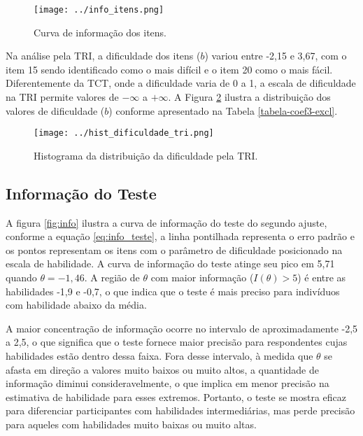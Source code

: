 \clearpage
\begin{figure}[H]
	\centering
	\caption{Curva de informação dos itens.}
	\texttt{[image: ../info\_itens.png]}
	\parbox{\textwidth}{
		\centering %
	}
	\label{fig:info_itens}
\end{figure}

Na análise pela TRI, a dificuldade dos itens ($b$) variou entre -2,15 e 3,67, com o item 15 sendo identificado como o mais difícil e o item 20 como o mais fácil. Diferentemente da TCT, onde a dificuldade varia de 0 a 1, a escala de dificuldade na TRI permite valores de $- \infty$ a $+ \infty$. A Figura \ref{fig:dificuldade_tri} ilustra a distribuição dos valores de dificuldade ($b$) conforme apresentado na Tabela \ref{tabela-coef3-excl}.

\begin{figure}[H]
	\centering
	\caption{Histograma da distribuição da dificuldade pela TRI.}
	\texttt{[image: ../hist\_dificuldade\_tri.png]}
	\parbox{\textwidth}{
		\centering %
	}	
	\label{fig:dificuldade_tri}
\end{figure}


\subsection{Informação do Teste}

A figura \ref{fig:info} ilustra a curva de informação do teste do segundo ajuste, conforme a equação \ref{eq:info_teste}, a linha pontilhada representa o erro padrão e os pontos representam os itens com o parâmetro de dificuldade posicionado na escala de habilidade. A curva de informação do teste atinge seu pico em 5,71 quando $\theta = -1,46$. A região de $\theta$ com maior informação ($I(\theta) > 5$) é entre as habilidades -1,9 e -0,7, o que indica que o teste é mais preciso para indivíduos com habilidade abaixo da média. 

A maior concentração de informação ocorre no intervalo de aproximadamente -2,5 a 2,5, o que significa que o teste fornece maior precisão para respondentes cujas habilidades estão dentro dessa faixa. Fora desse intervalo, à medida que $\theta$ se afasta em direção a valores muito baixos ou muito altos, a quantidade de informação diminui consideravelmente, o que implica em menor precisão na estimativa de habilidade para esses extremos. Portanto, o teste se mostra eficaz para diferenciar participantes com habilidades intermediárias, mas perde precisão para aqueles com habilidades muito baixas ou muito altas.


